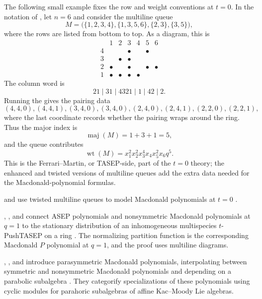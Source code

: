 \begin{example}
The following small example fixes the row and weight conventions at $t=0$.
In the notation of \cite[Defs.~3.1, 3.12 and Ex.~3.16]{MandelshtamValenciaPorras2024x},
let $n=6$ and consider the multiline queue
\[
  M=
  \bigl(
    \{1,2,3,4\},
    \{1,3,5,6\},
    \{2,3\},
    \{3,5\}
  \bigr),
\]
where the rows are listed from bottom to top.  As a diagram, this is
\[
\begin{array}{c|cccccc}
     & 1 & 2 & 3 & 4 & 5 & 6 \\ \hline
  4  &   &   & \bullet &   & \bullet &   \\
  3  &   & \bullet & \bullet &   &   &   \\
  2  & \bullet &   & \bullet &   & \bullet & \bullet \\
  1  & \bullet & \bullet & \bullet & \bullet &   &
\end{array}
\]
The column word is
\[
  21 \mid 31 \mid 4321 \mid 1 \mid 42 \mid 2.
\]
Running the 
\label{ferrariMartinPairingAlgorithm} gives the pairing data
\[
  (4,4,0),(4,4,1),(3,4,0),(3,4,0),
  (2,4,0),(2,4,1),(2,2,0),(2,2,1),
\]
where the last coordinate records whether the pairing wraps around the ring.
Thus the major index is
\[
  \operatorname{maj}(M)=1+3+1=5,
\]
and the queue contributes
\[
  \operatorname{wt}(M)=x_1^2x_2^2x_3^4x_4x_5^2x_6q^5.
\]
This is the Ferrari--Martin, or TASEP-side, part of the $t=0$ theory; the
enhanced and twisted versions of multiline queues add the extra data needed
for the Macdonald-polynomial formulas.
\end{example}

 and  use twisted
multiline queues to model Macdonald polynomials at $t=0$
\cite{MandelshtamValenciaPorras2024x}.

, , and  connect
ASEP polynomials and nonsymmetric Macdonald polynomials at $q=1$ to the
stationary distribution of an inhomogeneous multispecies $t$-PushTASEP on a
ring \cite{AyyerMartinWilliams2024x}.  The normalizing partition function is
the corresponding Macdonald $P$ polynomial at $q=1$, and the proof uses
multiline diagrams.

, , and
 introduce parasymmetric Macdonald polynomials,
interpolating between symmetric and nonsymmetric Macdonald polynomials and
depending on a parabolic subalgebra \cite{FeiginKhoroshkinMakedonskyi2023x}.
They categorify specializations of these polynomials using cyclic modules for
parahoric subalgebras of affine Kac--Moody Lie algebras.


